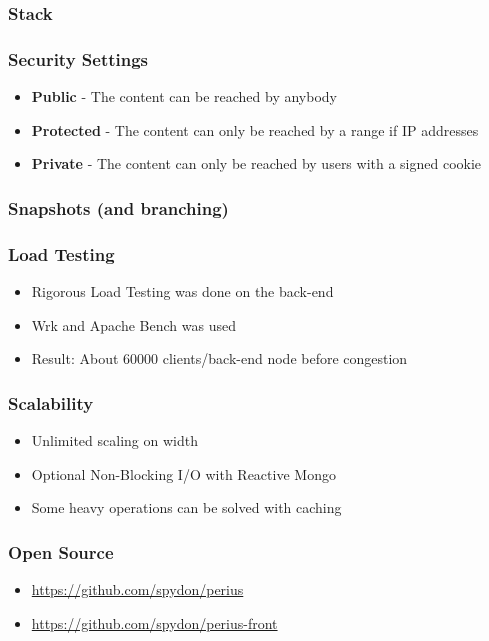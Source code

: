 \documentclass{beamer}
\begin{document}
\begin{frame}
  \frametitle{Stack}
  \centerline{}
\end{frame}

\begin{frame}
  \frametitle{Security Settings}
  \begin{itemize}
    \item{\textbf{Public} - The content can be reached by anybody}
    \pause
    \item{\textbf{Protected} - The content can only be reached by a range if IP addresses}
    \pause
    \item{\textbf{Private} - The content can only be reached by users with a signed cookie}
  \end{itemize}
\end{frame}

\begin{frame}
  \frametitle{Snapshots (and branching)}
  \centerline{}
\end{frame}

\begin{frame}
  \frametitle{Load Testing}
  \begin{itemize}
    \item{Rigorous Load Testing was done on the back-end}
    \pause
    \item{Wrk and Apache Bench was used}
    \pause
    \item{Result: About 60000 clients/back-end node before congestion}
  \end{itemize}
\end{frame}

\begin{frame}
  \frametitle{Scalability}
  \begin{itemize}
    \item{Unlimited scaling on width}
    \pause
    \item{Optional Non-Blocking I/O with Reactive Mongo}
    \pause
    \item{Some heavy operations can be solved with caching} %
  \end{itemize}
\end{frame}

\begin{frame}
  \frametitle{Open Source}
  \begin{itemize}
    \item{\url{https://github.com/spydon/perius}}
    \item{\url{https://github.com/spydon/perius-front}}
  \end{itemize}
\end{frame}

\begin{frame}
\end{frame}

\begin{frame}
\end{frame}
\end{document}
